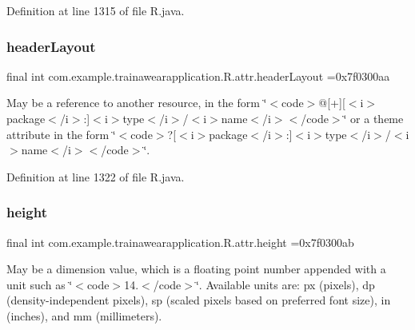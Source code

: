 Definition at line 1315 of file R.\+java.

\mbox{\label{classcom_1_1example_1_1trainawearapplication_1_1_r_1_1attr_a5058eab513ec90065077ce4648121cec}} 
\subsubsection{\texorpdfstring{headerLayout}{headerLayout}}
{\footnotesize\ttfamily final int com.\+example.\+trainawearapplication.\+R.\+attr.\+header\+Layout =0x7f0300aa\hspace{0.3cm}{\ttfamily [static]}}

May be a reference to another resource, in the form \char`\"{}$<$code$>$@\mbox{[}+\mbox{]}\mbox{[}$<$i$>$package$<$/i$>$\+:\mbox{]}$<$i$>$type$<$/i$>$/$<$i$>$name$<$/i$>$$<$/code$>$\char`\"{} or a theme attribute in the form \char`\"{}$<$code$>$?\mbox{[}$<$i$>$package$<$/i$>$\+:\mbox{]}$<$i$>$type$<$/i$>$/$<$i$>$name$<$/i$>$$<$/code$>$\char`\"{}. 

Definition at line 1322 of file R.\+java.

\mbox{\label{classcom_1_1example_1_1trainawearapplication_1_1_r_1_1attr_a2885f6269b89a2ed84a6687905799bb9}} 
\subsubsection{\texorpdfstring{height}{height}}
{\footnotesize\ttfamily final int com.\+example.\+trainawearapplication.\+R.\+attr.\+height =0x7f0300ab\hspace{0.3cm}{\ttfamily [static]}}

May be a dimension value, which is a floating point number appended with a unit such as \char`\"{}$<$code$>$14.\+5sp$<$/code$>$\char`\"{}. Available units are\+: px (pixels), dp (density-\/independent pixels), sp (scaled pixels based on preferred font size), in (inches), and mm (millimeters). 

